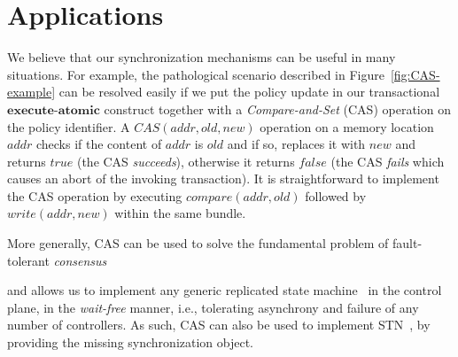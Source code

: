 \documentclass[conference]{sigcomm-alternate}
\newcommand{\hide}[1]{}
\newcommand{\cas}{CAS\xspace}
\newcommand{\compare}{compare\xspace}
\newcommand{\memwrite}{write\xspace}
\newcommand{\addr}{\textit{addr}\xspace}
\newcommand{\execatomic}{\textbf{execute-atomic}}
\newcommand{\true}{\textit{true}}
\newcommand{\false}{\textit{false}}
\begin{document}
\section{Applications}\label{sec:apps}

We believe that our synchronization mechanisms 
can be useful in many situations. 
For example, the pathological scenario described in 
Figure~\ref{fig:CAS-example} can be resolved easily if we put
the policy update in our transactional $\execatomic$ construct together
 with a \emph{Compare-and-Set} (CAS) operation on the policy identifier.
A $\cas(\addr,\textit{old},\textit{new})$ operation on a memory location $\addr$
checks if the content of $\addr$ is $\textit{old}$ and if so,
replaces it with $\textit{new}$ and returns $\true$ (the CAS
\emph{succeeds}), otherwise it returns $\false$ (the CAS
\emph{fails} which causes an abort of
the invoking transaction).
It is straightforward to implement the CAS operation by executing
$\textit{\compare}(\addr, old)$ followed by $\textit{\memwrite}(\addr,
new)$ within the same bundle.

\hide{
As can be seen Algorithm \ref{alg:cas}, CAS is implemented by two commands. These commands should be sent as part of the same bundle

\begin{algorithm}[t]
    \caption{$\textit{\cas}(\addr, old,new)$}
    \label{alg:cas}
    \begin{algorithmic}[1]

    		\State $cmd1\gets \textsc{\compare}(\addr, old) $
    		\State $cmd2\gets \textsc{\memwrite}(\addr, new) $
			\Return $cmd1,cmd2$
    \end{algorithmic}
\end{algorithm}
}

More generally, CAS can be used to solve the fundamental
problem of fault-tolerant \emph{consensus}~\cite{FLP85}
\hide{%
 in which the controllers
need to agree on one of their private inputs, despite failures of an
arbitrary number of controllers.
Indeed, each controller simply performs, within a transaction, a CAS operation to replace the default value
in a memory location at the meta-configuration of a data plane switch.
If the transaction commits, the controller considers itself
the \emph{winner} and decides on its input,
if it aborts (the controller fails in the CAS), it remains to read the
memory to get the input of the winner and decide on it.
}
and allows us
to implement any generic replicated state machine~\cite{Her91}
in the control plane,  in the \emph{wait-free} manner, i.e., tolerating
asynchrony and failure of any number of controllers.
As such, CAS can also be used to implement STN~\cite{stn},
by providing the missing synchronization object.
\end{document}
